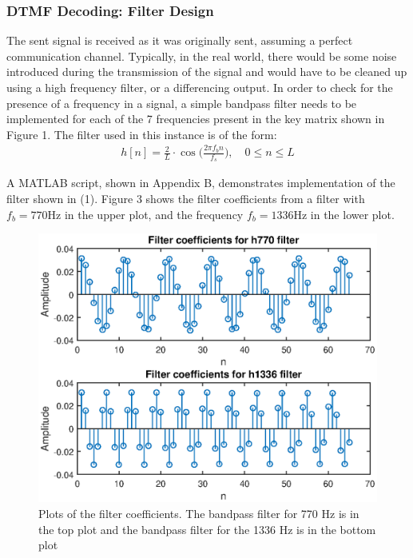 \documentclass{article}
\begin{document}
\subsubsection{DTMF Decoding: Filter Design}
The sent signal is received as it was originally sent, assuming a perfect communication channel. Typically, in the real world, there would be some noise introduced during the transmission of the signal and would have to be cleaned up using a high frequency filter, or a differencing output. In order to check for the presence of a frequency in a signal, a simple bandpass filter needs to be implemented for each of the 7 frequencies present in the key matrix shown in Figure 1. The filter used in this instance is of the form:
\begin{align}
	h[n] = \frac{2}{L} \cdot \cos \bigg(\frac{2 \pi f_b n}{f_s}\bigg), \quad 0 \leq n \leq L
\end{align}

A MATLAB script, shown in Appendix B, demonstrates implementation of the filter shown in (1). Figure 3 shows the filter coefficients from a filter with $f_b = 770 \si{\hertz}$ in the upper plot, and the frequency $f_b = 1336 \si{\hertz}$ in the lower plot. 

\begin{figure}[H]
	\centering
	\includegraphics[scale=0.55]{fig2}
	\caption{Plots of the filter coefficients. The bandpass filter for 770 $\si{\hertz}$ is in the top plot and the bandpass filter for the 1336 $\si{\hertz}$ is in the bottom plot}
\end{figure}
\end{document}
